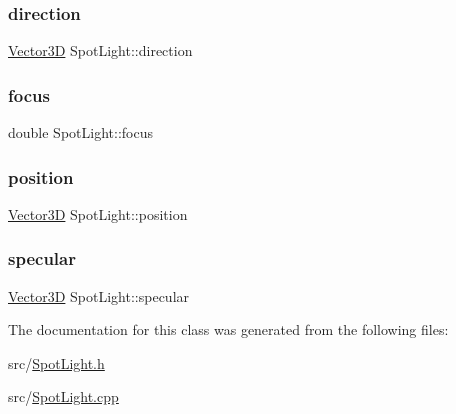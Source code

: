 \mbox{\label{classSpotLight_a536a59851dfaafa45f15c120295a1d24}} 
\subsubsection{\texorpdfstring{direction}{direction}}
{\footnotesize\ttfamily \mbox{\hyperlink{classVector3D}{Vector3D}} Spot\+Light\+::direction\hspace{0.3cm}{\ttfamily [private]}}

\mbox{\label{classSpotLight_a0fe5ae38bd4778e16fc2c1587c554a69}} 
\subsubsection{\texorpdfstring{focus}{focus}}
{\footnotesize\ttfamily double Spot\+Light\+::focus\hspace{0.3cm}{\ttfamily [private]}}

\mbox{\label{classSpotLight_aca124556510f5fd4d44660174f077cd7}} 
\subsubsection{\texorpdfstring{position}{position}}
{\footnotesize\ttfamily \mbox{\hyperlink{classVector3D}{Vector3D}} Spot\+Light\+::position\hspace{0.3cm}{\ttfamily [private]}}

\mbox{\label{classSpotLight_a21623e0e4a294ddb7068ee618dfab1d6}} 
\subsubsection{\texorpdfstring{specular}{specular}}
{\footnotesize\ttfamily \mbox{\hyperlink{classVector3D}{Vector3D}} Spot\+Light\+::specular\hspace{0.3cm}{\ttfamily [private]}}



The documentation for this class was generated from the following files\+:\begin{DoxyCompactItemize}
\item 
src/\mbox{\hyperlink{SpotLight_8h}{Spot\+Light.\+h}}\item 
src/\mbox{\hyperlink{SpotLight_8cpp}{Spot\+Light.\+cpp}}\end{DoxyCompactItemize}
